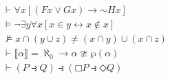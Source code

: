\documentclass[varwidth=6.4cm, margin={-4pt 8pt 20pt -4pt}]{standalone}
\begin{document}
\begin{align*}
  & \vdash \forall x [(Fx \vee Gx) \to \mathord{\sim} Hx] \\
  & \vDash \neg \exists y \forall x [x \in y \leftrightarrow x \notin x]  \\
  & \nvDash x \cap (y \cup z) \neq (x \cap y) \cup (x \cap z) \\
  & \vdash \lBrack\alpha\rBrack = \aleph_0 \to \alpha \ncong \wp(\alpha) \\
  & \vdash (P \rightfishtail Q) \rightfishtail
    (\mdlgwhtsquare P \rightfishtail \mdlgwhtdiamond Q)
\end{align*}

\end{document}
